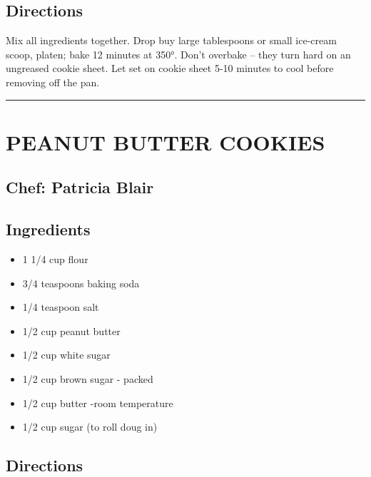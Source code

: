 \documentclass[
]{book}
\providecommand{\tightlist}{%
  \setlength{\itemsep}{0pt}\setlength{\parskip}{0pt}}
\begin{document}
\hypertarget{directions-102}{%
\subsection*{Directions}\label{directions-102}}


Mix all ingredients together. Drop buy large tablespoons or small ice-cream scoop, platen; bake 12 minutes at 350°. Don't overbake -- they turn hard on an ungreased cookie sheet. Let set on cookie sheet 5-10 minutes to cool before removing off the pan.

\begin{center}\rule{0.5\linewidth}{0.5pt}\end{center}

\hypertarget{peanut-butter-cookies}{%
\section*{PEANUT BUTTER COOKIES}\label{peanut-butter-cookies}}


\hypertarget{chef-patricia-blair-17}{%
\subsection*{Chef: Patricia Blair}\label{chef-patricia-blair-17}}


\hypertarget{ingredients-103}{%
\subsection*{Ingredients}\label{ingredients-103}}


\begin{itemize}
\tightlist
\item
  1 1/4 cup flour
\item
  3/4 teaspoons baking soda
\item
  1/4 teaspoon salt
\item
  1/2 cup peanut butter
\item
  1/2 cup white sugar
\item
  1/2 cup brown sugar - packed
\item
  1/2 cup butter -room temperature
\item
  1/2 cup sugar (to roll doug in)
\end{itemize}

\hypertarget{directions-103}{%
\subsection*{Directions}\label{directions-103}}
\end{document}
